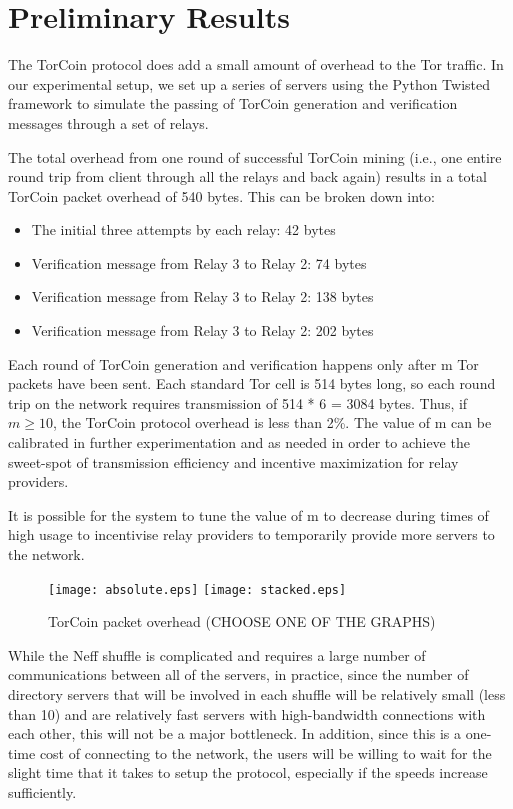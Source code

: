 \section{Preliminary Results}

The TorCoin protocol does add a small amount of overhead to the Tor traffic.
In our experimental setup, we set up a series of servers using the Python
Twisted framework to simulate the passing of TorCoin generation and
verification messages through a set of relays.

The total overhead from one round of successful TorCoin mining (i.e., one entire round trip from client through all the relays and back again) results in a total TorCoin packet overhead of 540 bytes. This can be broken down into: 

\begin{itemize}
\item The initial three attempts by each relay: 42 bytes
\item Verification message from Relay 3 to Relay 2: 74 bytes
\item Verification message from Relay 3 to Relay 2: 138 bytes
\item Verification message from Relay 3 to Relay 2: 202 bytes
\end{itemize}

Each round of TorCoin generation and verification happens only after m Tor
packets have been sent. Each standard Tor cell is 514 bytes long, so each
round trip on the network requires transmission of 514 * 6 = 3084 bytes. Thus,
if $m \geq 10$, the TorCoin protocol overhead is less than 2\%. The value of m
can be calibrated in further experimentation and as needed in order to achieve
the sweet-spot of transmission efficiency and incentive maximization for relay
providers.

It is possible for the system to tune the value of m to decrease during times
of high usage to incentivise relay providers to temporarily provide more
servers to the network.

\begin{figure}
  \centering
    \texttt{[image: absolute.eps]}
    \texttt{[image: stacked.eps]}
  \caption{TorCoin packet overhead (CHOOSE ONE OF THE GRAPHS)}
\end{figure}

While the Neff shuffle is complicated and requires a large number of
communications between all of the servers, in practice, since the number of
directory servers that will be involved in each shuffle will be relatively
small (less than 10) and are relatively fast servers with high-bandwidth
connections with each other, this will not be a major bottleneck. In addition,
since this is a one-time cost of connecting to the network, the users will be
willing to wait for the slight time that it takes to setup the protocol,
especially if the speeds increase sufficiently.
